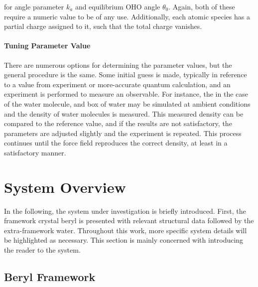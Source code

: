             \noindent for angle parameter $k_a$ and equilibrium OHO angle $\theta_0$. Again, both of these require a numeric value to be of any use. Additionally, each atomic species has a partial charge assigned to it, such that the total charge vanishes.

            
            \paragraph{Tuning Parameter Value} There are numerous options for determining the parameter values, but the general procedure is the same. Some initial guess is made, typically in reference to a value from experiment or more-accurate quantum calculation, and an experiment is performed to measure an observable. For instance, the in the case of the water molecule, and box of water may be simulated at ambient conditions and the density of water molecules is measured. This measured density can be compared to the reference value, and if the results are not satisfactory, the parameters are adjusted slightly and the experiment is repeated. This process continues until the force field reproduces the correct density, at least in a satisfactory manner.

    \section{System Overview}
    
    In the following, the system under investigation is briefly introduced. First, the framework crystal beryl is presented with relevant structural data followed by the extra-framework water. Throughout this work, more specific system details will be highlighted as necessary. This section is mainly concerned with introducing the reader to the system.
    
        \subsection{Beryl Framework}
        
